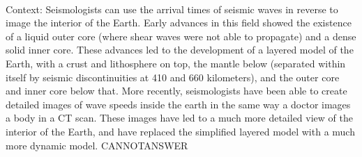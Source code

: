 \documentclass[11pt,a4paper, onecolumn]{article}
\begin{document}
\\ Context: Seismologists can use the arrival times of seismic waves in reverse to image the interior of the Earth. Early advances in this field showed the existence of a liquid outer core (where shear waves were not able to propagate) and a dense solid inner core. These advances led to the development of a layered model of the Earth, with a crust and lithosphere on top, the mantle below (separated within itself by seismic discontinuities at 410 and 660 kilometers), and the outer core and inner core below that. More recently, seismologists have been able to create detailed images of wave speeds inside the earth in the same way a doctor images a body in a CT scan. These images have led to a much more detailed view of the interior of the Earth, and have replaced the simplified layered model with a much more dynamic model. CANNOTANSWER
\end{document}
